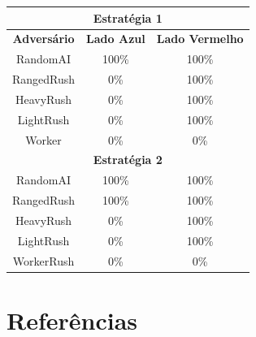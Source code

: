 \documentclass[a0,portrait]{a0poster}
\begin{document}
\begin{multicols}{2}
	{\large
		\begin{center}
		\begin{tabular}{|c|c|c|}
			\hline
			\multicolumn{3}{|c|}{\textbf{Estratégia 1}}                       \\ \hline
			\textbf{Adversário} & \textbf{Lado Azul} & \textbf{Lado Vermelho} \\ \hline
			RandomAI            & 100\%              & 100\%                  \\
			RangedRush          & 0\%                & 100\%                  \\
			HeavyRush           & 0\%                & 100\%                  \\
			LightRush           & 0\%                & 100\%                  \\
			Worker              & 0\%                & 0\%                    \\ \hline
			\multicolumn{3}{|c|}{\textbf{Estratégia 2}}                       \\ \hline
			RandomAI            & 100\%              & 100\%                  \\
			RangedRush          & 100\%              & 100\%                  \\
			HeavyRush           & 0\%                & 100\%                  \\
			LightRush           & 0\%                & 100\%                  \\
			WorkerRush          & 0\%                & 0\%                    \\ \hline
		\end{tabular}
		\label{tab:resultados}
		\end{center}
	}
	\large
	\color{NavyBlue}
	\section*{Referências}
	\renewcommand{\section}[2]{}
	\color{Black}
	\raggedright
	
	
	
\end{multicols}
\end{document}
